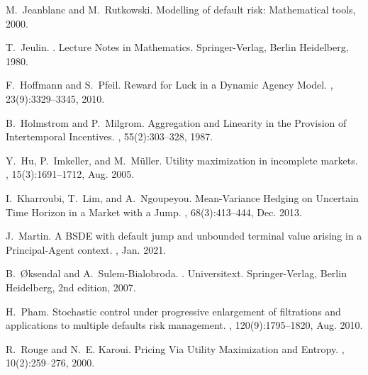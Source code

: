 \documentclass[numbook, envcountsect, envcountsame, envcountreset, runningheads, smallextended]{article}
\begin{document}
\begin{thebibliography}{1}
M.~Jeanblanc and M.~Rutkowski.
\newblock Modelling of default risk: Mathematical tools, 2000.


T.~Jeulin.
.
\newblock Lecture {Notes} in {Mathematics}. Springer-Verlag, Berlin Heidelberg,
  1980.
  
  
 F.~Hoffmann and S.~Pfeil.
\newblock Reward for {Luck} in a {Dynamic} {Agency} {Model}.
, 23(9):3329--3345, 2010.


B.~Holmstrom and P.~Milgrom.
\newblock Aggregation and {Linearity} in the {Provision} of {Intertemporal}
  {Incentives}.
, 55(2):303--328, 1987.

% 

Y.~Hu, P.~Imkeller, and M.~Müller.
\newblock Utility maximization in incomplete markets.
, 15(3):1691--1712, Aug. 2005.

I.~Kharroubi, T.~Lim, and A.~Ngoupeyou.
\newblock Mean-{Variance} {Hedging} on {Uncertain} {Time} {Horizon} in a
  {Market} with a {Jump}.
, 68(3):413--444, Dec. 2013.



J.~Martin.
\newblock A {BSDE} with default jump and unbounded terminal value arising in a
  {Principal}-{Agent} context.
, Jan. 2021.

B.~Øksendal and A.~Sulem-Bialobroda.
.
\newblock Universitext. Springer-Verlag, Berlin Heidelberg, 2nd edition, 2007.

H.~Pham.
\newblock Stochastic control under progressive enlargement of filtrations and
  applications to multiple defaults risk management.
, 120(9):1795--1820,
  Aug. 2010.
  
  
R.~Rouge and N.~E. Karoui.
\newblock Pricing {Via} {Utility} {Maximization} and {Entropy}.
, 10(2):259--276, 2000.


\end{thebibliography}
\end{document}
